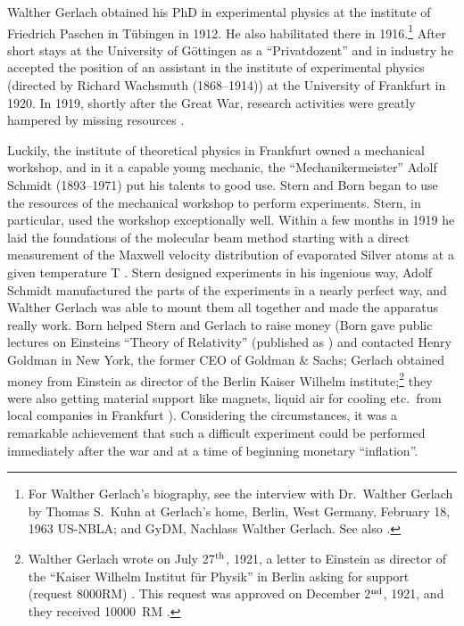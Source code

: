 \documentclass{article}
\begin{document}
Walther Gerlach obtained his PhD in experimental physics at the institute of Friedrich Paschen in Tübingen in 1912. He also habilitated there in 1916.\footnote{For Walther Gerlach's biography, see the interview with Dr.~Walther Gerlach by Thomas S.\ Kuhn at Gerlach's home, Berlin, West Germany, February 18, 1963 US-NBLA; and GyDM, Nachlass Walther Gerlach. See also \citep{HuberJG2014Gerlach,FuesslW1998Nachlass,HeinrichREtal1989Gerlach, NidaRuemelinM1982Bibliographie}.} After short stays at the University of Göttingen as a ``Privatdozent'' and in industry he accepted the position of an assistant in the institute of experimental physics (directed by Richard Wachsmuth (1868--1914)) at the University of Frankfurt in 1920. In 1919, shortly after the Great War, research activities were greatly hampered by missing resources \citep{FrickeHNoDateJahre}. 

Luckily, the institute of theoretical physics in Frankfurt owned a mechanical workshop, and in it a  capable young mechanic, the ``Mechanikermeister'' Adolf Schmidt (1893--1971) put his talents to good use. Stern and Born began to use the resources of the mechanical workshop to perform experiments. Stern, in particular, used the workshop exceptionally well. Within a few months in 1919 he laid the foundations of the molecular beam method starting with a direct measurement of the Maxwell velocity distribution of evaporated Silver atoms at a given temperature T \citep{SternO1920Messung,SternO1920Messung2,SternO1920Nachtrag}. Stern designed experiments in his ingenious way, Adolf Schmidt manufactured the parts of the experiments in a nearly perfect way, and Walther Gerlach was able to mount them all together and made the apparatus really work. Born helped Stern and Gerlach to raise money (Born gave public lectures on Einsteins ``Theory of Relativity'' (published as \citep{BornM1920Relativitaetstheorie}) and contacted Henry Goldman in New York, the former CEO of Goldman \& Sachs; Gerlach obtained money from Einstein as director of the Berlin Kaiser Wilhelm institute;\footnote{Walther Gerlach wrote on July 27$^{\rm th}$, 1921, a letter to Einstein as director of the ``Kaiser Wilhelm Institut für Physik'' in Berlin asking for support (request 8000RM) \cite[p.~783]{CPAE13}. This request was approved on December 2$^{\rm nd}$, 1921, 
and they received 10000~RM \cite[pp.~476, 477, 479, 482]{CPAE12}.} they were also getting material support like magnets, liquid air for cooling etc.\ from local companies in Frankfurt \citep{SchmidtBoeckingHEtal2011Stern,ToenniesJEtal2011Stern}). Considering the circumstances, it was a remarkable achievement that such a difficult experiment could be performed immediately after the war and at a time of beginning monetary ``inflation''. 
 
\end{document}
